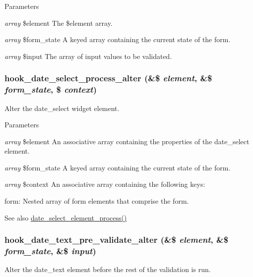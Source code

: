 \begin{DoxyParams}{Parameters}
\item[{\em array}]\$element The \$element array. \item[{\em array}]\$form\_\-state A keyed array containing the current state of the form. \item[{\em array}]\$input The array of input values to be validated. \end{DoxyParams}
\hypertarget{date_8api_8php_a0688e456a52d3e4bdaaa63337d49e74c}{
\subsubsection[{hook\_\-date\_\-select\_\-process\_\-alter}]{\setlength{\rightskip}{0pt plus 5cm}hook\_\-date\_\-select\_\-process\_\-alter (\&\$ {\em element}, \/  \&\$ {\em form\_\-state}, \/  \$ {\em context})}}
\label{date_8api_8php_a0688e456a52d3e4bdaaa63337d49e74c}
Alter the date\_\-select widget element.


\begin{DoxyParams}{Parameters}
\item[{\em array}]\$element An associative array containing the properties of the date\_\-select element. \item[{\em array}]\$form\_\-state A keyed array containing the current state of the form. \item[{\em array}]\$context An associative array containing the following keys:
\begin{DoxyItemize}
\item form: Nested array of form elements that comprise the form.
\end{DoxyItemize}\end{DoxyParams}
\begin{DoxySeeAlso}{See also}
\hyperlink{date__api__elements_8inc_adabdb1eea05a7d11cb2108a18f01aeed}{date\_\-select\_\-element\_\-process()} 
\end{DoxySeeAlso}
\hypertarget{date_8api_8php_a2fc6fc0b5b0092304084ce3ce29741ae}{
\subsubsection[{hook\_\-date\_\-text\_\-pre\_\-validate\_\-alter}]{\setlength{\rightskip}{0pt plus 5cm}hook\_\-date\_\-text\_\-pre\_\-validate\_\-alter (\&\$ {\em element}, \/  \&\$ {\em form\_\-state}, \/  \&\$ {\em input})}}
\label{date_8api_8php_a2fc6fc0b5b0092304084ce3ce29741ae}
Alter the date\_\-text element before the rest of the validation is run.


